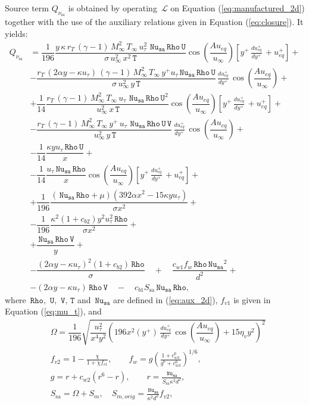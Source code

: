 \documentclass[10pt]{article}
\newcommand{\Rho}{\,\mathtt{Rho}}
\newcommand{\U}{\,\mathtt{U}}
\newcommand{\V}{\,\mathtt{V}}
\newcommand{\Nu}{\,\mathtt{Nu_{sa}}}
\newcommand{\T}{\,\mathtt{T}}
\newcommand{\Lo}{\,\mathcal{L}}
\newcommand{\Dueqplusyplus}{\, \frac{du_{eq}^+}{dy^+}\,}
\newcommand{\sa}{\nu_{\mathrm{sa}}}
\newcommand{\tsa}{\mathrm{sa}}
\begin{document}
Source term $Q_{\sa}$ is obtained by operating $\Lo$ on Equation  (\ref{eq:manufactured_2d}) together with the use of the  auxiliary relations given in Equation (\ref{eq:closure}). It yields:
\begin{equation}
 \begin{split}
  Q_{\sa} &=  \dfrac{1}{196}\dfrac{y\, \kappa\, r_T\, (\gamma-1) \, M_{\infty}^2 \,T_{\infty}\, u_{\tau}^2 \,\Nu \Rho \U  }{\sigma \, u_{\infty}^2 \, x^2 \T}\cos\left(\dfrac{A u_{eq}}{u_{\infty}}\right) \left[y^{+} \Dueqplusyplus+u_{eq}^{+}\right]+\\ 
&-\dfrac{ r_T \, (2 \alpha y -\kappa  u_{\tau})\,(\gamma-1) \, M_{\infty}^2 \, T_{\infty} \, y^{+} u_{\tau}  \Nu \Rho \U }{\sigma \, u_{\infty}^2 \,y \T}\Dueqplusyplus\cos\left(\dfrac{A u_{eq}}{u_{\infty}}\right) +\\ 
&+\dfrac{1}{14}\dfrac{ r_T \,(\gamma-1)\,M_{\infty}^2 \,T_{\infty}\, u_{\tau}\, \Nu \Rho \U^2 }{\, u_{\infty}^2 \, x \T}  \cos\left(\dfrac{A u_{eq}}{u_{\infty}}\right)\left[y^{+} \Dueqplusyplus+u_{eq}^{+}\right]+ \\ 
&-\dfrac{r_T \, (\gamma-1) \, M_{\infty}^2 \, T_{\infty} \,  y^{+} \, u_{\tau} \,  \Nu \Rho \U \V }{\, u_{\infty}^2 \, y \T}\Dueqplusyplus\cos\left(\dfrac{A u_{eq}}{u_{\infty}}\right)+ \\ &-\dfrac{1}{14}\dfrac{ \kappa y u_{\tau} \Rho \U}{x}+\\ 
&-\dfrac{1}{14}\dfrac{ u_{\tau} \Nu \Rho}{x} \cos\left(\dfrac{A u_{eq}}{u_{\infty}}\right) \left[y^{+} \Dueqplusyplus+u_{eq}^{+}\right]+\\ 
&+\dfrac{1}{196} \dfrac{(\Nu \Rho+\mu) (392 \alpha x^2-15 \kappa y u_{\tau})}{\sigma x^2}+\\ 
&-\dfrac{1}{196}\dfrac{ \kappa^2 (1+c_{b2}) y^2 u_{\tau}^2 \Rho}{\sigma x^2}+\\ 
&+\dfrac{\Nu \Rho \V}{y}+\\ 
&-\dfrac{(2 \alpha y-\kappa u_{\tau})^2 (1+c_{b2}) \Rho}{\sigma}\quad+\quad \dfrac{c_{w1} f_w \Rho \Nu^2}{d^2}+\\
&-(2 \alpha y-\kappa u_{\tau}) \Rho \V \quad -\quad c_{b1} S_\tsa  \Nu \Rho ,
 \end{split}
\end{equation}
where $\Rho,\, \U,\,\V, \T$ and $\Nu$ are defined in (\ref{eq:aux_2d}), $f_{v1}$ is given in  Equation (\ref{eq:mu_t}), and
%
\begin{equation}
 \begin{split}
&\Omega = \dfrac{1}{196} \sqrt{\dfrac{u_{\tau}^2}{x^4 y^2} \left(196 x^2 (y^{+}) \Dueqplusyplus \cos\left(\dfrac{A u_{eq}}{u_{\infty}}\right)+15 \eta_v y^2\right)^2 } \\
&f_{v2} = 1 - \frac{\chi}{1 + \chi f_{v1}}, \qquad f_w = g \left( \frac{1 + c_{w3}^6}{g^6 + c_{w3}^6} \right)^{1/6}, \quad \\
& g = r + c_{w2} \left( r^6 - r \right), \qquad r = \frac{\Nu}{S_{\mathrm{sa}} \kappa^2 d^2},\\
&S_{\mathrm{sa}} = \Omega + S_m ,\quad S_{m, orig} = \frac{\Nu}{\kappa^2 d^2} f_{v2},
\end{split}
\end{equation}
\end{document}
